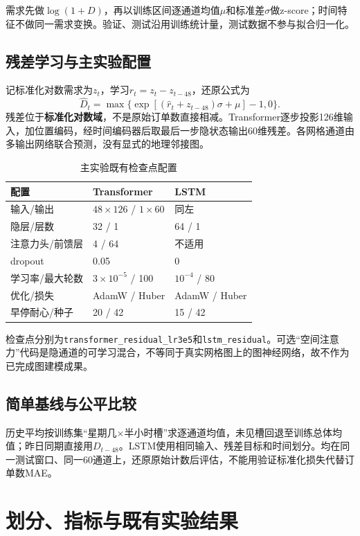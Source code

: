 \documentclass[11pt]{ctexart}
\begin{document}
需求先做$\log(1+D)$，再以训练区间逐通道均值$\mu$和标准差$\sigma$做z-score；时间特征不做同一需求变换。验证、测试沿用训练统计量，测试数据不参与拟合归一化。

\subsection{残差学习与主实验配置}
记标准化对数需求为$z_t$，学习$r_t=z_t-z_{t-48}$，还原公式为
\[\hat D_t=\max\{\exp[(\hat r_t+z_{t-48})\sigma+\mu]-1,0\}.\]
残差位于\textbf{标准化对数域}，不是原始订单数直接相减。Transformer逐步投影126维输入，加位置编码，经时间编码器后取最后一步隐状态输出60维残差。各网格通道由多输出网络联合预测，没有显式的地理邻接图。
\begin{table}[H]\centering\small\caption{主实验既有检查点配置}
\begin{tabular}{lll}\toprule
配置 & Transformer & LSTM\\\midrule
输入/输出 & $48\times126$ / $1\times60$ & 同左\\
隐层/层数 & 32 / 1 & 64 / 1\\
注意力头/前馈层 & 4 / 64 & 不适用\\
dropout & 0.05 & 0\\
学习率/最大轮数 & $3\times10^{-5}$ / 100 & $10^{-4}$ / 80\\
优化/损失 & AdamW / Huber & AdamW / Huber\\
早停耐心/种子 & 20 / 42 & 15 / 42\\\bottomrule
\end{tabular}\end{table}
检查点分别为\texttt{transformer\_residual\_lr3e5}和\texttt{lstm\_residual}。可选“空间注意力”代码是隐通道的可学习混合，不等同于真实网格图上的图神经网络，故不作为已完成图建模成果。

\subsection{简单基线与公平比较}
历史平均按训练集“星期几$\times$半小时槽”求逐通道均值，未见槽回退至训练总体均值；昨日同期直接用$D_{t-48}$。LSTM使用相同输入、残差目标和时间划分。均在同一测试窗口、同一60通道上，还原原始计数后评估，不能用验证标准化损失代替订单数MAE。

\section{划分、指标与既有实验结果}
\end{document}
